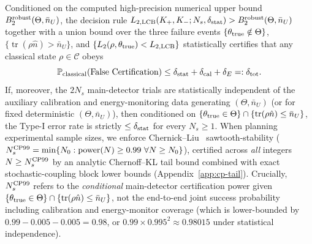 \documentclass{iopjournal}
\newcommand{\tr}{\operatorname{tr}}
\newcommand{\Cset}{\mathcal{C}}
\newcommand{\nU}{\bar n_U}
\begin{document}
Conditioned on the computed high-precision numerical upper bound $B_2^{\rm robust}(\Theta,\nU)$, the decision rule $L_{2,\rm LCB}(K_+, K_-; N_s, \delta_{\rm stat}) > B_2^{\rm robust}(\Theta,\nU)$ together with a union bound over the three failure events $\{\theta_{\rm true} \notin \Theta\}$, $\{\tr(\rho\hat n) > \nU\}$, and $\{L_2(\rho,\theta_{\rm true}) < L_{2,\rm LCB}\}$ statistically certifies that any classical state $\rho \in \Cset$ obeys
\begin{equation}\label{eq:union-budget}
\mathbb{P}_{\rm classical}(\text{False Certification}) \le \delta_{\rm stat} + \delta_{\rm cal} + \delta_E =: \delta_{\rm tot}.
\end{equation}
If, moreover, the $2N_s$ main-detector trials are statistically independent of the auxiliary calibration and energy-monitoring data generating $(\Theta,\nU)$ (or for fixed deterministic $(\Theta,\nU)$), then conditioned on $\{\theta_{\rm true} \in \Theta\} \cap \{\tr(\rho\hat n) \le \nU\}$, the Type-I error rate is strictly $\le \delta_{\rm stat}$ for every $N_s \ge 1$. When planning experimental sample sizes, we enforce Chernick--Liu~\cite{ChernickLiu2002} sawtooth-stability ($N_s^{\rm CP99} = \min\{N_0 : \operatorname{power}(N) \ge 0.99\ \forall N \ge N_0\}$), certified across \emph{all} integers $N \ge N_s^{\rm CP99}$ by an analytic Chernoff--KL tail bound combined with exact stochastic-coupling block lower bounds (Appendix~\ref{app:cp-tail}). Crucially, $N_s^{\rm CP99}$ refers to the \emph{conditional} main-detector certification power given $\{\theta_{\rm true} \in \Theta\} \cap \{\tr(\rho\hat n) \le \nU\}$, not the end-to-end joint success probability including calibration and energy-monitor coverage (which is lower-bounded by $0.99 - 0.005 - 0.005 = 0.98$, or $0.99 \times 0.995^2 \approx 0.98015$ under statistical independence).
\end{document}
